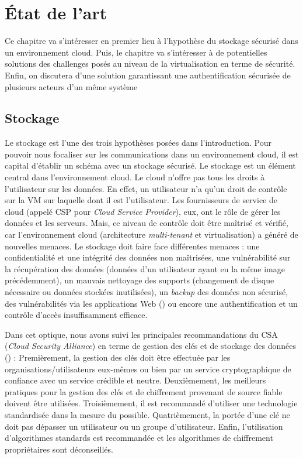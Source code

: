 \begingroup
\renewcommand{\cleardoublepage}{}
\renewcommand{\clearpage}{}
\chapter{État de l'art}
\endgroup

Ce chapitre va s'intéresser en premier lieu à l'hypothèse du stockage sécurisé dans un
environnement cloud. Puis, le chapitre va s'intéresser à de potentielles solutions des challenges posés au niveau de la virtualisation en terme de sécurité. Enfin, on discutera d'une solution garantissant une authentification sécurisée de plusieurs acteurs d’un même système

\section{Stockage}\label{sec:sto}

Le stockage est l'une des trois hypothèses posées dans l'introduction. Pour
pouvoir nous focaliser sur les communications dans un environnement cloud, il
est capital d'établir un schéma avec un stockage sécurisé. Le stockage est un
élément central dans l'environnement cloud. Le cloud n’offre pas tous les
droits à l’utilisateur sur les données. En effet, un utilisateur n'a qu'un
droit de contrôle sur la VM sur laquelle dont il est l'utilisateur. Les
fournisseurs de service de cloud (appelé CSP pour \textit{Cloud Service Provider}), eux, ont le rôle de gérer les données
et les serveurs. Mais, ce niveau de contrôle doit être maîtrisé et vérifié, car
l'environnement cloud (architecture \textit{multi-tenant} et virtualisation) a généré de nouvelles menaces. Le stockage doit faire face différentes menaces : une confidentialité et une intégrité des données non maîtrisées, une vulnérabilité sur la récupération des données (données d'un utilisateur ayant eu la même image précédemment), un mauvais nettoyage des supports (changement de disque nécessaire ou données stockées inutilisées), un \textit{backup} des données non sécurisé, des vulnérabilités via les applications Web (\cite{web_security}) ou encore une authentification et un contrôle d'accès insuffisamment efficace.

Dans cet optique, nous avons suivi les principales recommandations du CSA
(\textit{Cloud Security Alliance}) en terme de gestion des clés et de stockage des données (\cite{security_guidelines}) :
Premièrement, la gestion des clés doit être effectuée par les organisations/utilisateurs eux-mêmes ou bien par un service cryptographique de confiance avec un service crédible et neutre. Deuxièmement, les meilleurs pratiques pour la gestion des clés et de chiffrement provenant de source fiable doivent être utilisées. Troisièmement, il est recommandé d'utiliser une technologie standardisée dans la mesure du possible. Quatrièmement, la portée d'une clé ne doit pas dépasser un utilisateur ou un groupe d'utilisateur. Enfin, l'utilisation d'algorithmes standards est recommandée et les algorithmes de chiffrement propriétaires sont déconseillés.

